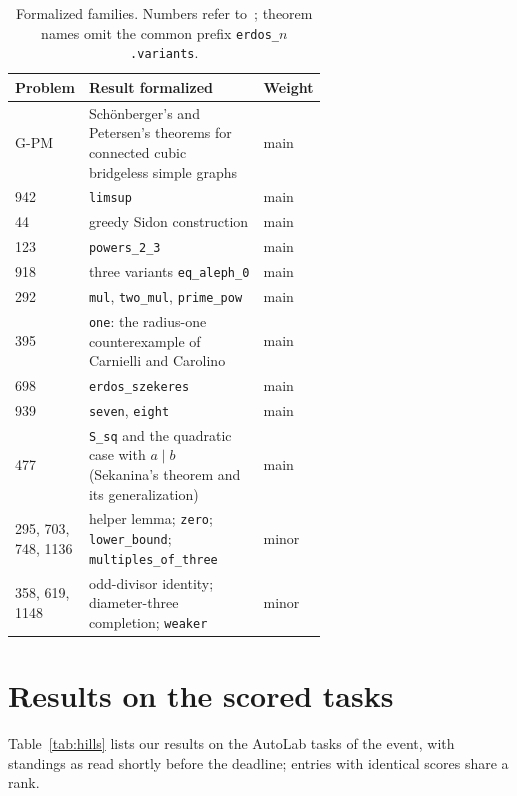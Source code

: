 \documentclass[11pt,a4paper]{article}
\newcommand{\lean}[1]{\texttt{#1}}
\theoremstyle{remark}
\begin{document}
\begin{table}[ht]
\centering\small
\caption{Formalized families. Numbers refer to~\cite{erdosproblems}; theorem names omit the common prefix
\lean{erdos\_}$n$\lean{.variants}.}\label{tab:m2}
\begin{tabular}{@{}l>{\raggedright\arraybackslash}p{0.62\linewidth}l@{}}
\toprule
Problem & Result formalized & Weight\\\midrule
G-PM & Sch\"onberger's and Petersen's theorems for connected cubic bridgeless simple graphs & main\\
942 & \lean{limsup} & main\\
44 & greedy Sidon construction & main\\
123 & \lean{powers\_2\_3} & main\\
918 & three variants \lean{eq\_aleph\_0} & main\\
292 & \lean{mul}, \lean{two\_mul}, \lean{prime\_pow} & main\\
395 & \lean{one}: the radius-one counterexample of Carnielli and Carolino & main\\
698 & \lean{erdos\_szekeres} & main\\
939 & \lean{seven}, \lean{eight} & main\\
477 & \lean{S\_sq} and the quadratic case with $a\mid b$ (Sekanina's theorem and its generalization) & main\\
295, 703, 748, 1136 & helper lemma; \lean{zero}; \lean{lower\_bound}; \lean{multiples\_of\_three} & minor\\
358, 619, 1148 & odd-divisor identity; diameter-three completion; \lean{weaker} & minor\\
\bottomrule
\end{tabular}
\end{table}

\section{Results on the scored tasks}\label{sec:hills}

Table~\ref{tab:hills} lists our results on the AutoLab tasks of the event, with standings as read shortly before the
deadline; entries with identical scores share a rank.
\end{document}
